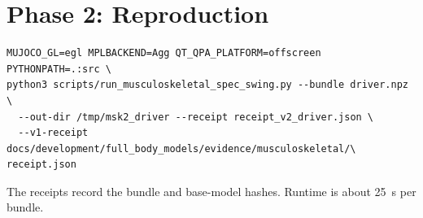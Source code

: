 \documentclass[11pt,a4paper]{article}
\begin{document}
\section{Phase 2: Reproduction}
\begin{verbatim}
MUJOCO_GL=egl MPLBACKEND=Agg QT_QPA_PLATFORM=offscreen PYTHONPATH=.:src \
python3 scripts/run_musculoskeletal_spec_swing.py --bundle driver.npz \
  --out-dir /tmp/msk2_driver --receipt receipt_v2_driver.json \
  --v1-receipt docs/development/full_body_models/evidence/musculoskeletal/\
receipt.json
\end{verbatim}
The receipts record the bundle and base-model hashes. Runtime is about 25~s per bundle.
\end{document}
